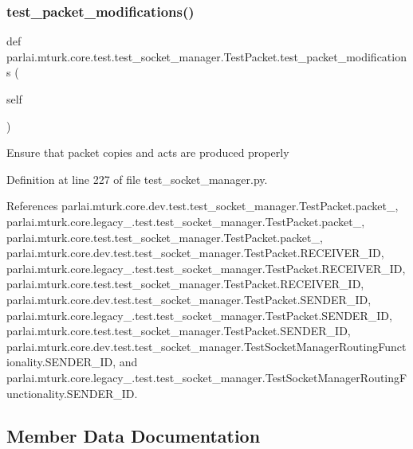 \subsubsection{\texorpdfstring{test\+\_\+packet\+\_\+modifications()}{test\_packet\_modifications()}}
{\footnotesize\ttfamily def parlai.\+mturk.\+core.\+test.\+test\+\_\+socket\+\_\+manager.\+Test\+Packet.\+test\+\_\+packet\+\_\+modifications (\begin{DoxyParamCaption}\item[{}]{self }\end{DoxyParamCaption})}

\begin{DoxyVerb}Ensure that packet copies and acts are produced properly\end{DoxyVerb}
 

Definition at line 227 of file test\+\_\+socket\+\_\+manager.\+py.



References parlai.\+mturk.\+core.\+dev.\+test.\+test\+\_\+socket\+\_\+manager.\+Test\+Packet.\+packet\+\_, parlai.\+mturk.\+core.\+legacy\+\_.\+test.\+test\+\_\+socket\+\_\+manager.\+Test\+Packet.\+packet\+\_, parlai.\+mturk.\+core.\+test.\+test\+\_\+socket\+\_\+manager.\+Test\+Packet.\+packet\+\_, parlai.\+mturk.\+core.\+dev.\+test.\+test\+\_\+socket\+\_\+manager.\+Test\+Packet.\+R\+E\+C\+E\+I\+V\+E\+R\+\_\+\+ID, parlai.\+mturk.\+core.\+legacy\+\_.\+test.\+test\+\_\+socket\+\_\+manager.\+Test\+Packet.\+R\+E\+C\+E\+I\+V\+E\+R\+\_\+\+ID, parlai.\+mturk.\+core.\+test.\+test\+\_\+socket\+\_\+manager.\+Test\+Packet.\+R\+E\+C\+E\+I\+V\+E\+R\+\_\+\+ID, parlai.\+mturk.\+core.\+dev.\+test.\+test\+\_\+socket\+\_\+manager.\+Test\+Packet.\+S\+E\+N\+D\+E\+R\+\_\+\+ID, parlai.\+mturk.\+core.\+legacy\+\_.\+test.\+test\+\_\+socket\+\_\+manager.\+Test\+Packet.\+S\+E\+N\+D\+E\+R\+\_\+\+ID, parlai.\+mturk.\+core.\+test.\+test\+\_\+socket\+\_\+manager.\+Test\+Packet.\+S\+E\+N\+D\+E\+R\+\_\+\+ID, parlai.\+mturk.\+core.\+dev.\+test.\+test\+\_\+socket\+\_\+manager.\+Test\+Socket\+Manager\+Routing\+Functionality.\+S\+E\+N\+D\+E\+R\+\_\+\+ID, and parlai.\+mturk.\+core.\+legacy\+\_.\+test.\+test\+\_\+socket\+\_\+manager.\+Test\+Socket\+Manager\+Routing\+Functionality.\+S\+E\+N\+D\+E\+R\+\_\+\+ID.



\subsection{Member Data Documentation}
\mbox{\label{classparlai_1_1mturk_1_1core_1_1test_1_1test__socket__manager_1_1TestPacket_a9a2b210715d16703e52da66668621561}} 
